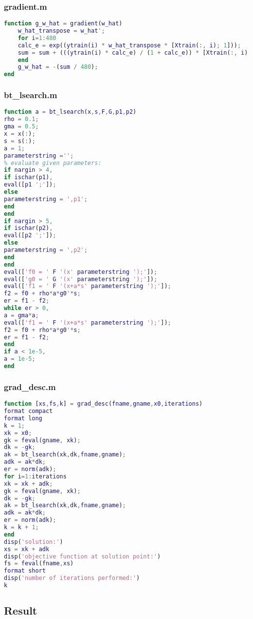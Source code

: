 \subsubsection{gradient.m}
\label{subsubsect:gradient}
\begin{lstlisting}[language=Matlab]
function g_w_hat = gradient(w_hat)
	w_hat_transpose = w_hat';
	for i=1:480
	calc_e = exp((ytrain(i) * w_hat_transpose * [Xtrain(:, i); 1]));
	sum = sum + (((ytrain(i) * calc_e) / (1 + calc_e)) * [Xtrain(:, i); 1]);
	end
	g_w_hat = -(sum / 480);
end
\end{lstlisting}

\subsubsection{bt\_lsearch.m}
\label{subsubsect:bt_lsearch}
\begin{lstlisting}[language=Matlab]
function a = bt_lsearch(x,s,F,G,p1,p2)
rho = 0.1;
gma = 0.5;
x = x(:);
s = s(:);
a = 1;
parameterstring ='';
% evaluate given parameters:
if nargin > 4,
if ischar(p1),
eval([p1 ';']);
else
parameterstring = ',p1';
end
end
if nargin > 5,
if ischar(p2),
eval([p2 ';']);
else
parameterstring = ',p2';
end
end
eval(['f0 = ' F '(x' parameterstring ');']);
eval(['g0 = ' G '(x' parameterstring ');']);
eval(['f1 = ' F '(x+a*s' parameterstring ');']);
f2 = f0 + rho*a*g0'*s;
er = f1 - f2;
while er > 0,
a = gma*a;
eval(['f1 = ' F '(x+a*s' parameterstring ');']);
f2 = f0 + rho*a*g0'*s;
er = f1 - f2;
end
if a < 1e-5,
a = 1e-5;
end 
\end{lstlisting}

\subsubsection{grad\_desc.m}
\label{subsubsect:grad_desc}
\begin{lstlisting}[language=Matlab]
function [xs,fs,k] = grad_desc(fname,gname,x0,iterations)
format compact
format long
k = 1;
xk = x0;
gk = feval(gname, xk);
dk = -gk;
ak = bt_lsearch(xk,dk,fname,gname);
adk = ak*dk;
er = norm(adk);
for i=1:iterations
xk = xk + adk;
gk = feval(gname, xk);
dk = -gk;
ak = bt_lsearch(xk,dk,fname,gname);
adk = ak*dk;
er = norm(adk);
k = k + 1;
end
disp('solution:')
xs = xk + adk
disp('objective function at solution point:')
fs = feval(fname,xs)
format short
disp('number of iterations performed:')
k
\end{lstlisting}

\subsection{Result}
\label{subsect:result}
